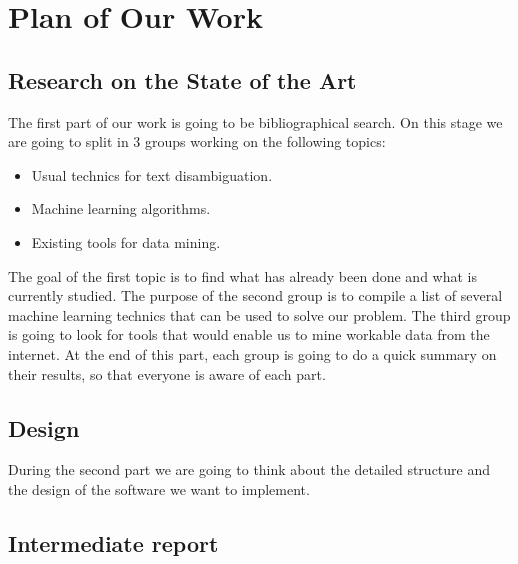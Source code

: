 \documentclass[11pt,a4paper]{article}
\begin{document}
\section{Plan of Our Work}
\subsection{Research on the State of the Art}

The first part of our work is going to be bibliographical search. On this stage we are going to split in 3 groups working on the following topics:
\begin{itemize}
	\item Usual technics for text disambiguation.
	\item Machine learning algorithms.
	\item Existing tools for data mining.
\end{itemize}
The goal of the first topic is to find what has already been done and what is currently studied. The purpose of the second group is to compile a list of several machine learning technics that can be used to solve our problem. The third group is going to look for tools that would enable us to mine workable data from the internet.
At the end of this part, each group is going to do a quick summary on their results, so that everyone is aware of each part.

\subsection{Design}

During the second part we are going to think about the detailed structure and the design of the software we want to implement. 



\subsection{Intermediate report}
\end{document}
